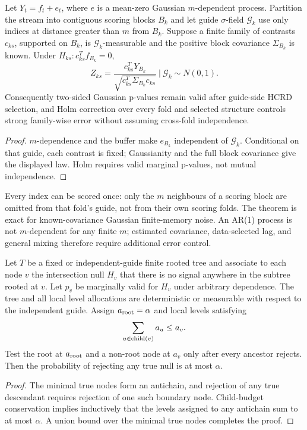 \begin{theorem}
\label{thm:buffered}
Let $Y_t=f_t+e_t$, where $e$ is a mean-zero Gaussian $m$-dependent process.
Partition the stream into contiguous scoring blocks $B_k$ and let guide
$\sigma$-field $\mathcal G_k$ use only indices at distance greater than $m$
from $B_k$.  Suppose a finite family of contrasts $c_{ks}$, supported on
$B_k$, is $\mathcal G_k$-measurable and the positive block covariance
$\Sigma_{B_k}$ is known.  Under
$H_{ks}:c_{ks}^Tf_{B_k}=0$,
\begin{equation}
 Z_{ks}=\frac{c_{ks}^TY_{B_k}}
 {\sqrt{c_{ks}^T\Sigma_{B_k}c_{ks}}}
 \ \bigg|\ \mathcal G_k \sim N(0,1).
\end{equation}
Consequently two-sided Gaussian p-values remain valid after guide-side HCRD
selection, and Holm correction over every fold and selected structure controls
strong family-wise error without assuming cross-fold independence.
\end{theorem}
\begin{proof}
$m$-dependence and the buffer make $e_{B_k}$ independent of
$\mathcal G_k$.  Conditional on that guide, each contrast is fixed; Gaussianity
and the full block covariance give the displayed law.  Holm requires valid
marginal p-values, not mutual independence.
\end{proof}

Every index can be scored once: only the $m$ neighbours of a scoring block are
omitted from that fold's guide, not from their own scoring folds.  The theorem
is exact for known-covariance Gaussian finite-memory noise.  An AR(1) process is
not $m$-dependent for any finite $m$; estimated covariance, data-selected lag,
and general mixing therefore require additional error control.

\begin{theorem}
\label{thm:tree}
Let $T$ be a fixed or independent-guide finite rooted tree and associate to
each node $v$ the intersection null $H_v$ that there is no signal anywhere in
the subtree rooted at $v$.  Let $p_v$ be marginally valid for $H_v$ under
arbitrary dependence.  The tree and all local level allocations are
deterministic or measurable with respect to the independent guide.  Assign
$a_{\rm root}=\alpha$ and local levels satisfying
\begin{equation}
 \sum_{u\in{\rm child}(v)}a_u\le a_v .
\end{equation}
Test the root at $a_{\rm root}$ and a non-root node at $a_v$ only after every
ancestor rejects.  Then the probability of rejecting any true null is at most
$\alpha$.
\end{theorem}
\begin{proof}
The minimal true nodes form an antichain, and rejection of any true descendant
requires rejection of one such boundary node.  Child-budget conservation
implies inductively that the levels assigned to any antichain sum to at most
$\alpha$.  A union bound over the minimal true nodes completes the proof.
\end{proof}

